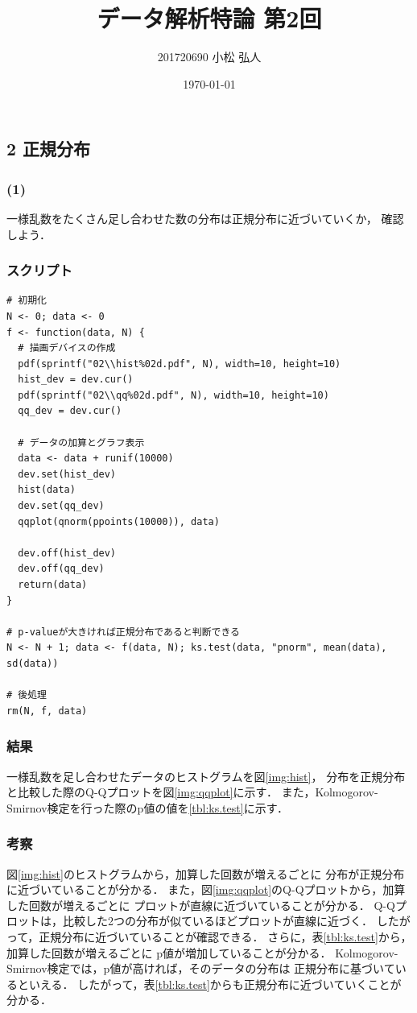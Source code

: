 \documentclass{jsarticle}
\title{データ解析特論 第2回}
\author{201720690 小松 弘人}
\date{\today}
\begin{document}
\maketitle
\subsection*{2 正規分布}
\subsubsection*{(1)}
一様乱数をたくさん足し合わせた数の分布は正規分布に近づいていくか，
確認しよう．

\subsubsection*{スクリプト}
\begin{lstlisting}[basicstyle=\ttfamily\footnotesize, frame=single]
# 初期化
N <- 0; data <- 0
f <- function(data, N) {
  # 描画デバイスの作成
  pdf(sprintf("02\\hist%02d.pdf", N), width=10, height=10)
  hist_dev = dev.cur()
  pdf(sprintf("02\\qq%02d.pdf", N), width=10, height=10)
  qq_dev = dev.cur()

  # データの加算とグラフ表示
  data <- data + runif(10000)
  dev.set(hist_dev)
  hist(data)
  dev.set(qq_dev)
  qqplot(qnorm(ppoints(10000)), data)

  dev.off(hist_dev)
  dev.off(qq_dev)
  return(data)
}

# p-valueが大きければ正規分布であると判断できる
N <- N + 1; data <- f(data, N); ks.test(data, "pnorm", mean(data), sd(data))

# 後処理
rm(N, f, data)
\end{lstlisting}

\subsubsection*{結果}
一様乱数を足し合わせたデータのヒストグラムを図\ref{img:hist}，
分布を正規分布と比較した際のQ-Qプロットを図\ref{img:qqplot}に示す．
また，Kolmogorov-Smirnov検定を行った際のp値の値を\ref{tbl:ks.test}に示す．

\subsubsection*{考察}
図\ref{img:hist}のヒストグラムから，加算した回数が増えるごとに
分布が正規分布に近づいていることが分かる．
また，図\ref{img:qqplot}のQ-Qプロットから，加算した回数が増えるごとに
プロットが直線に近づいていることが分かる．
Q-Qプロットは，比較した2つの分布が似ているほどプロットが直線に近づく．
したがって，正規分布に近づいていることが確認できる．
さらに，表\ref{tbl:ks.test}から，加算した回数が増えるごとに
p値が増加していることが分かる．
Kolmogorov-Smirnov検定では，p値が高ければ，そのデータの分布は
正規分布に基づいているといえる．
したがって，表\ref{tbl:ks.test}からも正規分布に近づいていくことが分かる．
\end{document}
